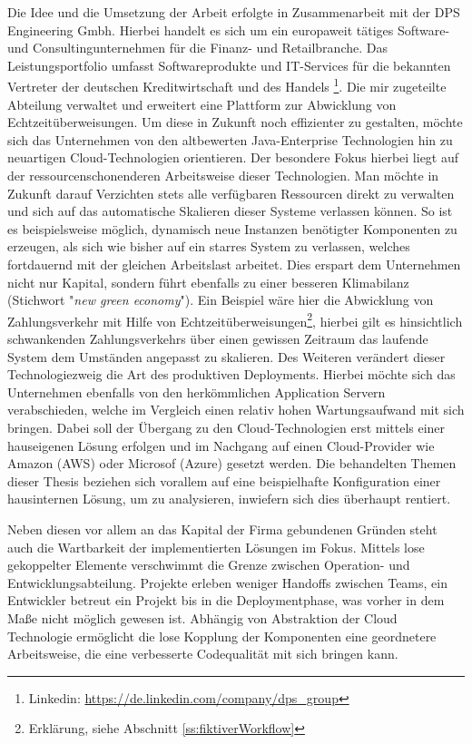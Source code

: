 Die Idee und die Umsetzung der Arbeit erfolgte in Zusammenarbeit mit der DPS Engineering Gmbh. Hierbei handelt es sich um ein europaweit tätiges Software- und Consultingunternehmen für die Finanz- und Retailbranche. Das Leistungsportfolio umfasst Softwareprodukte und IT-Services für die bekannten Vertreter der deutschen Kreditwirtschaft und des Handels \footnote{Linkedin: \url{https://de.linkedin.com/company/dps_group}}. Die mir zugeteilte Abteilung verwaltet und erweitert eine Plattform zur Abwicklung von Echtzeitüberweisungen. Um diese in Zukunft noch effizienter zu gestalten, möchte sich das Unternehmen von den altbewerten Java-Enterprise Technologien hin zu neuartigen Cloud-Technologien orientieren. Der besondere Fokus hierbei liegt auf der ressourcenschonenderen Arbeitsweise dieser Technologien. Man möchte in Zukunft darauf Verzichten stets alle verfügbaren Ressourcen direkt zu verwalten und sich auf das automatische Skalieren dieser Systeme verlassen können. So ist es beispielsweise möglich, dynamisch neue Instanzen benötigter Komponenten zu erzeugen, als sich wie bisher auf ein starres System zu verlassen, welches fortdauernd mit der gleichen Arbeitslast arbeitet. Dies erspart dem Unternehmen nicht nur Kapital, sondern führt ebenfalls zu einer besseren Klimabilanz (Stichwort "\emph{new green economy}"). Ein Beispiel wäre hier die Abwicklung von Zahlungsverkehr mit Hilfe von Echtzeitüberweisungen\footnote{Erklärung, siehe Abschnitt \ref{ss:fiktiverWorkflow}}, hierbei gilt es hinsichtlich schwankenden Zahlungsverkehrs über einen gewissen Zeitraum das laufende System dem Umständen angepasst zu skalieren. Des Weiteren verändert dieser Technologiezweig die Art des produktiven Deployments. Hierbei möchte sich das Unternehmen ebenfalls von den herkömmlichen Application Servern verabschieden, welche im Vergleich einen relativ hohen Wartungsaufwand mit sich bringen. Dabei soll der Übergang zu den Cloud-Technologien erst mittels einer hauseigenen Lösung erfolgen und im Nachgang auf einen Cloud-Provider wie Amazon (AWS) oder Microsof (Azure) gesetzt werden. Die behandelten Themen dieser Thesis beziehen sich vorallem auf eine beispielhafte Konfiguration einer hausinternen Lösung, um zu analysieren, inwiefern sich dies überhaupt rentiert. 

Neben diesen vor allem an das Kapital der Firma gebundenen Gründen steht auch die Wartbarkeit der implementierten Lösungen im Fokus. Mittels lose gekoppelter Elemente verschwimmt die Grenze zwischen Operation- und Entwicklungsabteilung. Projekte erleben weniger Handoffs zwischen Teams, ein Entwickler betreut ein Projekt bis in die Deploymentphase, was vorher in dem Maße nicht möglich gewesen ist. Abhängig von Abstraktion der Cloud Technologie ermöglicht die lose Kopplung der Komponenten eine geordnetere Arbeitsweise, die eine verbesserte Codequalität mit sich bringen kann. 

